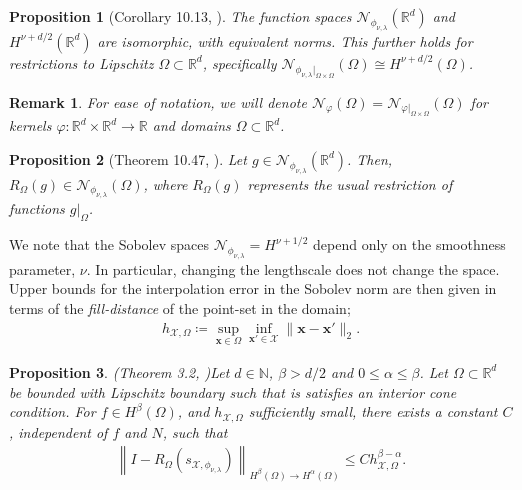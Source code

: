 \documentclass[pdflatex,sn-mathphys-num]{sn-jnl}%
\theoremstyle{thmstyleone}%
\newtheorem{proposition}{Proposition}%
\theoremstyle{thmstyletwo}%
\newtheorem{remark}{Remark}%
\theoremstyle{thmstylethree}%
\begin{document}
\begin{proposition}[Corollary 10.13, \cite{wendland_2004}]\label{prop:mat_sobolev}
    The function spaces \(\mathcal{N}_{\phi_{\nu,\lambda}}(\mathbb{R}^d)\) and \(H^{\nu+d/2}(\mathbb{R}^d)\) are isomorphic, with equivalent norms. This further holds for restrictions to Lipschitz \(\Omega\subset\mathbb{R}^d\), specifically \(\mathcal{N}_{\phi_{\nu,\lambda}|_{\Omega\times\Omega}}(\Omega)\cong H^{\nu+d/2}(\Omega)\).
\end{proposition}
\begin{remark}
For ease of notation, we will denote \(\mathcal{N}_{\varphi}(\Omega) =\mathcal{N}_{\varphi|_{\Omega\times\Omega}}(\Omega)\) for kernels \(\varphi:\mathbb{R}^d\times\mathbb{R}^d\rightarrow\mathbb{R}\) and domains \(\Omega\subset\mathbb{R}^d\).
\end{remark}
\begin{proposition}[Theorem 10.47, \cite{wendland_2004}]
    Let \(g\in\mathcal{N}_{\phi_{\nu,\lambda}}(\mathbb{R}^d
    )\). Then, \(R_{\Omega}(g)\in\mathcal{N}_{\phi_{\nu,\lambda}}(\Omega)\), where \(R_{\Omega}(g)\) represents the usual restriction of functions \(g|_\Omega\).
\end{proposition}
We note that the Sobolev spaces \(\mathcal{N}_{\phi_{\nu,\lambda}}=H^{\nu+1/2}\) depend only on the smoothness parameter, \(\nu\). In particular, changing the lengthscale does not change the space. Upper bounds for the interpolation error in the Sobolev norm are then given in terms of the \textit{fill-distance} of the point-set in the domain;
\begin{align}
    h_{\mathcal{X},\Omega}\coloneqq\sup_{\mathbf{x}\in\Omega}\inf_{\mathbf{x}'\in\mathcal{X}}\|\mathbf{x}-\mathbf{x}'\|_{2}.\nonumber
\end{align}
    
\begin{proposition}(Theorem 3.2, \cite{adt12})\label{prop: initial wendland}
    Let \(d\in\mathbb{N}\), \( \beta>d/2\) and \(0 \leq \alpha \leq \beta\). Let \(\Omega\subset\mathbb{R}^d\) be bounded with Lipschitz boundary such that is satisfies an interior cone condition. For \(f\in H^{\beta}(\Omega)\), and \(h_{\mathcal{X},\Omega}\) sufficiently small, there exists a constant $C$, independent of $f$ and $N$, such that
    \begin{align}
        \left\|I-R_{\Omega}(s_{\mathcal{X},\phi_{\nu,\lambda}})\right\|_{H^{\beta}(\Omega)\rightarrow H^{\alpha}(\Omega)}\leq Ch^{\beta-\alpha}_{\mathcal{X},\Omega}.\nonumber
    \end{align}
\end{proposition}
\end{document}
